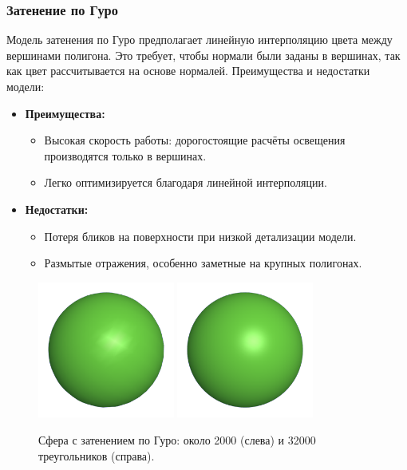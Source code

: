 \subsubsection{Затенение по Гуро}

\hspace{1.25cm}
Модель затенения по Гуро предполагает линейную интерполяцию цвета между вершинами полигона. Это требует, чтобы нормали были заданы в вершинах, так как цвет рассчитывается на основе нормалей. Преимущества и недостатки модели:

\begin{itemize}
    \item \textbf{Преимущества:}
    \begin{itemize}
        \item Высокая скорость работы: дорогостоящие расчёты освещения производятся только в вершинах.
        \item Легко оптимизируется благодаря линейной интерполяции.
    \end{itemize}
    \item \textbf{Недостатки:}
    \begin{itemize}
        \item Потеря бликов на поверхности при низкой детализации модели.
        \item Размытые отражения, особенно заметные на крупных полигонах.
    \end{itemize}
\end{itemize}

\begin{figure}[h!]
    \centering
    \includegraphics[width=0.4\textwidth]{img/gouraud1.png}
    \includegraphics[width=0.4\textwidth]{img/gouraud2.png}
    \caption{Сфера с затенением по Гуро: около 2000 (слева) и 32000 треугольников (справа).}
\end{figure}

